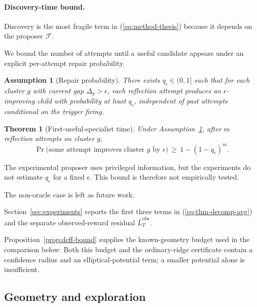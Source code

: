 \documentclass{article} %
\newtheorem{theorem}{Theorem}
\newtheorem{assumption}{Assumption}
\renewcommand{\eqref}[1]{\textup{(\ref{#1})}}
\begin{document}
\paragraph{Discovery-time bound.}

\label{sec:method-specialist}

Discovery is the most fragile term in \eqref{eq:method-thesis} because it depends on the proposer $\mathcal{F}$.

We bound the number of attempts until a useful candidate appears under an explicit per-attempt repair probability.

\begin{assumption}[Repair probability]
\label{ass:repair}
There exists $q_\epsilon \in (0,1]$ such that for each cluster $g$ with current gap $\Delta_g > \epsilon$, each reflection attempt produces an $\epsilon$-improving child with probability at least $q_\epsilon$, independent of past attempts conditional on the trigger firing.
\end{assumption}

\begin{theorem}[First-useful-specialist time]
\label{thm:specialist}
Under Assumption~\ref{ass:repair}, after $m$ reflection attempts on cluster $g$,
\begin{equation}
\label{eq:thm-specialist}
\Pr\bigl(\text{some attempt improves cluster } g \text{ by } \epsilon\bigr) \,\ge\, 1 - (1 - q_\epsilon)^m.
\end{equation}
\end{theorem}

The experimental proposer uses privileged information, but the experiments do not
estimate \(q_\epsilon\) for a fixed \(\epsilon\). This bound is therefore not
empirically tested.

The non-oracle case is left as future work.

Section~\ref{sec:experiments} reports the first three terms in
\eqref{eq:thm-decomp-avg} and the separate observed-reward residual
\(\bar L_T^{\mathrm{obs}}\).

Proposition~\ref{prop:deff-bound} supplies the known-geometry budget used in
the comparison below. Both this budget and the ordinary-ridge certificate
contain a confidence radius and an elliptical-potential term; a smaller
potential alone is insufficient.

\subsection{Geometry and exploration}
\end{document}
